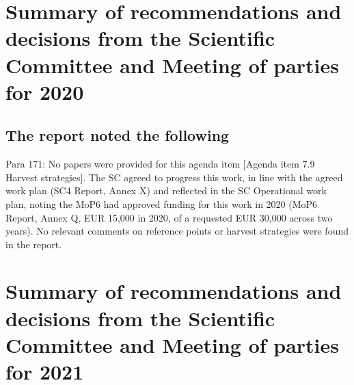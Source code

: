 \section{Summary of recommendations and decisions from the Scientific Committee and Meeting of parties for 2020}

\subsection{The \cite{SC5} report noted the following}

Para 171: No papers were provided for this agenda item [Agenda item 7.9 Harvest strategies]. The SC agreed to progress this work, in line with the agreed work plan (SC4 Report, Annex X) and reflected in the SC Operational work plan, noting the MoP6 had approved funding for this work in 2020 (MoP6 Report, Annex Q, EUR 15,000 in 2020, of a requested EUR 30,000 across two years).
No relevant comments on reference points or harvest strategies were found in the \cite{MoP7} report.

\section{Summary of recommendations and decisions from the Scientific Committee and Meeting of parties for 2021}

